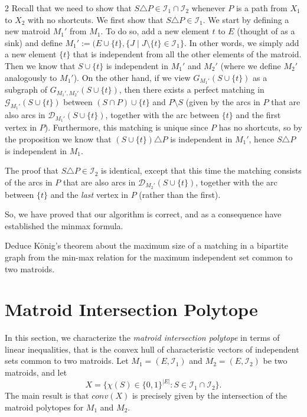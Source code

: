 \documentclass[12pt]{article}
\begin{document}
\begin{proof_of}{2} Recall that we need to show that $S \triangle P
\in \mathcal{I}_1 \cap \mathcal{I}_2$ whenever $P$ is a path from
$X_1$ to $X_2$ with no shortcuts. We first show that $S \triangle P
\in \mathcal{I}_1$. We start by defining a new matroid $M_1'$ from
$M_1$. To do so, add a new element $t$ to $E$ (thought of as a sink) and define $M_1' := (E \cup \{t\},\{J \mid J \setminus \{t\} \in
\mathcal{I}_1\}$. In other words, we simply add a new element $\{t\}$
that is independent from all the other elements of the matroid. Then
we know that $S \cup \{t\}$ is independent in $M_1'$ and $M_2'$ (where
we define $M_2'$ analogously to $M_1'$). On the other hand, if we view
$G_{M_1'}(S \cup \{t\})$ as a subgraph of
$G_{M_1',M_2'}(S \cup \{t\})$, then there exists a perfect
matching in $\mathcal{G}_{M_1'}(S \cup \{t\})$ between $(S \cap P)
\cup \{t\}$ and $P \setminus S$ (given by the arcs in $P$ that are
also arcs in $\mathcal{D}_{M_1'}(S \cup \{t\})$, together with the arc
between $\{t\}$ and the first vertex in $P$). Furthermore, this
matching is unique since $P$ has no shortcuts, so by the proposition
we know that $(S \cup \{t\}) \triangle P$ is independent in $M_1'$,
hence $S \triangle P$ is independent in $M_1$.

The proof that $S \triangle P \in \mathcal{I}_2$ is identical, except
that this time the matching consists of the arcs in $P$ that are also
arcs in $\mathcal{D}_{M_2'}(S \cup \{t\})$, together with the arc
between $\{t\}$ and the \emph{last} vertex in $P$ (rather than the
first).  \end{proof_of}

So, we have proved that our algorithm is correct, and as a consequence
have established the minmax formula.




\begin{exercises}
\item
Deduce K\"onig's theorem about the maximum size of a matching in a
bipartite graph from the min-max relation for the maximum independent
set common to two matroids. 
\end{exercises}

\section{Matroid Intersection Polytope}

In this section, we characterize the {\it matroid intersection
polytope} in terms of linear inequalities,
that is the convex hull of characteristic vectors of independent sets
common to two matroids. Let $M_1=(E,\mathcal{I}_1)$ and
$M_2=(E,\mathcal{I}_2)$ be two matroids, and let
$$X=\{\chi(S)\in\{0,1\}^{|E|}: S\in \mathcal{I}_1\cap
\mathcal{I}_2\}.$$ The main result is that $conv(X)$ is precisely given by the
intersection of the matroid polytopes for $M_1$ and $M_2$.  
\end{document}
